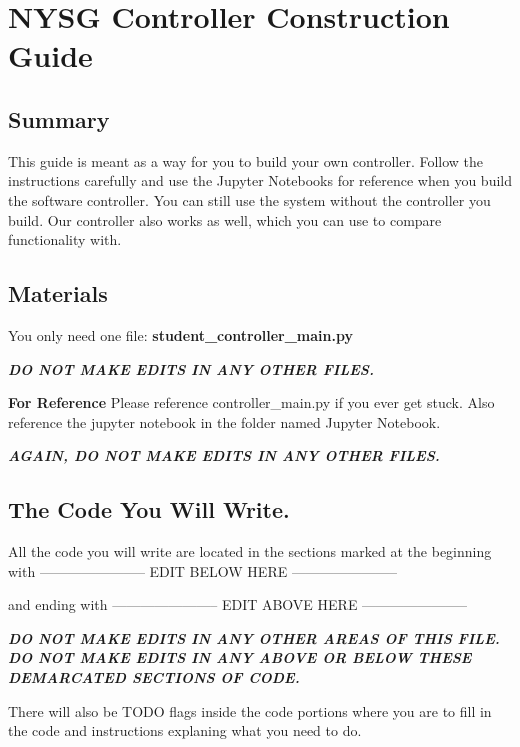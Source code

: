 \documentclass[
]{article}
\author{}
\date{}
\begin{document}
\hypertarget{nysg-controller-construction-guide}{%
\section{NYSG Controller Construction
Guide}\label{nysg-controller-construction-guide}}

\hypertarget{summary}{%
\subsection{Summary}\label{summary}}

This guide is meant as a way for you to build your own controller.
Follow the instructions carefully and use the Jupyter Notebooks for
reference when you build the software controller. You can still use the
system without the controller you build. Our controller also works as
well, which you can use to compare functionality with.

\hypertarget{materials}{%
\subsection{Materials}\label{materials}}

You only need one file: \textbf{student\_controller\_main.py}

\textbf{\emph{DO NOT MAKE EDITS IN ANY OTHER FILES.}}

\textbf{For Reference} Please reference controller\_main.py if you ever
get stuck. Also reference the jupyter notebook in the folder named
Jupyter Notebook.

\textbf{\emph{AGAIN, DO NOT MAKE EDITS IN ANY OTHER FILES.}}

\hypertarget{the-code-you-will-write.}{%
\subsection{The Code You Will Write.}\label{the-code-you-will-write.}}

All the code you will write are located in the sections marked at the
beginning with ----------------------- EDIT BELOW HERE
-----------------------

and ending with ----------------------- EDIT ABOVE HERE
-----------------------

\textbf{\emph{DO NOT MAKE EDITS IN ANY OTHER AREAS OF THIS FILE.}}
\textbf{\emph{DO NOT MAKE EDITS IN ANY ABOVE OR BELOW THESE DEMARCATED
SECTIONS OF CODE.}}

There will also be TODO flags inside the code portions where you are to
fill in the code and instructions explaning what you need to do.
\end{document}
